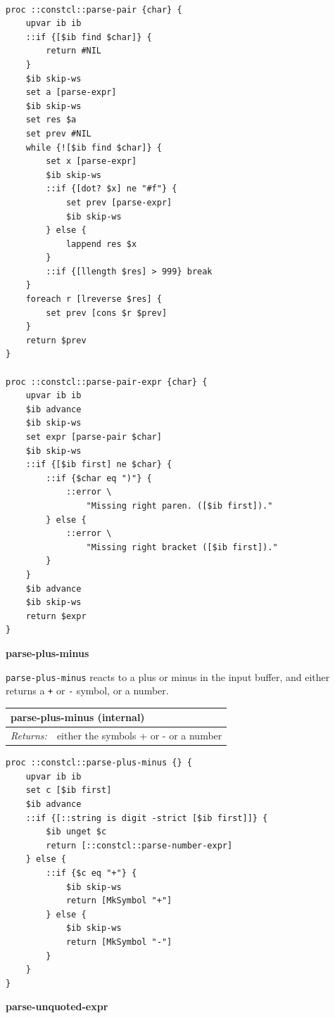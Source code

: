 \documentclass[twoside,9pt]{report}
\begin{document}
\noindent\makebox[\linewidth]{\rule{\linewidth}{0.4pt}}
\begin{lstlisting}
 
proc ::constcl::parse-pair {char} {
    upvar ib ib
    ::if {[$ib find $char]} {
        return #NIL
    }
    $ib skip-ws
    set a [parse-expr]
    $ib skip-ws
    set res $a
    set prev #NIL
    while {![$ib find $char]} {
        set x [parse-expr]
        $ib skip-ws
        ::if {[dot? $x] ne "#f"} {
            set prev [parse-expr]
            $ib skip-ws
        } else {
            lappend res $x
        }
        ::if {[llength $res] > 999} break
    }
    foreach r [lreverse $res] {
        set prev [cons $r $prev]
    }
    return $prev
}
 
proc ::constcl::parse-pair-expr {char} {
    upvar ib ib
    $ib advance
    $ib skip-ws
    set expr [parse-pair $char]
    $ib skip-ws
    ::if {[$ib first] ne $char} {
        ::if {$char eq ")"} {
            ::error \
                "Missing right paren. ([$ib first])."
        } else {
            ::error \
                "Missing right bracket ([$ib first])."
        }
    }
    $ib advance
    $ib skip-ws
    return $expr
}
\end{lstlisting}
\noindent\makebox[\linewidth]{\rule{\linewidth}{0.4pt}}

\textbf{parse-plus-minus}


\texttt{parse-plus-minus} reacts to a plus or minus in the input buffer, and either returns a \texttt{+} or \texttt{-} symbol, or a number.

\begin{tabular}{ |l l| }
\hline
\multicolumn{2}{|l|}{parse-plus-minus (internal)} \\
\hline
\textit{Returns:} & either the symbols + or - or a number \\
\hline
\end{tabular}

\noindent\makebox[\linewidth]{\rule{\linewidth}{0.4pt}}
\begin{lstlisting}
proc ::constcl::parse-plus-minus {} {
    upvar ib ib
    set c [$ib first]
    $ib advance
    ::if {[::string is digit -strict [$ib first]]} {
        $ib unget $c
        return [::constcl::parse-number-expr]
    } else {
        ::if {$c eq "+"} {
            $ib skip-ws
            return [MkSymbol "+"]
        } else {
            $ib skip-ws
            return [MkSymbol "-"]
        }
    }
}
\end{lstlisting}
\noindent\makebox[\linewidth]{\rule{\linewidth}{0.4pt}}

\textbf{parse-unquoted-expr}
\end{document}
